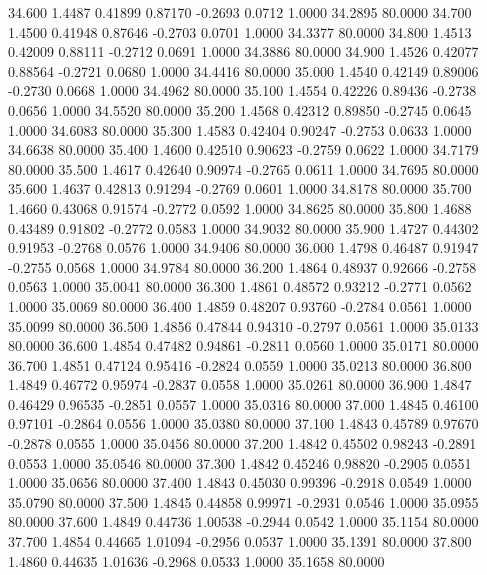   34.600   1.4487   0.41899   0.87170  -0.2693   0.0712   1.0000  34.2895  80.0000
  34.700   1.4500   0.41948   0.87646  -0.2703   0.0701   1.0000  34.3377  80.0000
  34.800   1.4513   0.42009   0.88111  -0.2712   0.0691   1.0000  34.3886  80.0000
  34.900   1.4526   0.42077   0.88564  -0.2721   0.0680   1.0000  34.4416  80.0000
  35.000   1.4540   0.42149   0.89006  -0.2730   0.0668   1.0000  34.4962  80.0000
  35.100   1.4554   0.42226   0.89436  -0.2738   0.0656   1.0000  34.5520  80.0000
  35.200   1.4568   0.42312   0.89850  -0.2745   0.0645   1.0000  34.6083  80.0000
  35.300   1.4583   0.42404   0.90247  -0.2753   0.0633   1.0000  34.6638  80.0000
  35.400   1.4600   0.42510   0.90623  -0.2759   0.0622   1.0000  34.7179  80.0000
  35.500   1.4617   0.42640   0.90974  -0.2765   0.0611   1.0000  34.7695  80.0000
  35.600   1.4637   0.42813   0.91294  -0.2769   0.0601   1.0000  34.8178  80.0000
  35.700   1.4660   0.43068   0.91574  -0.2772   0.0592   1.0000  34.8625  80.0000
  35.800   1.4688   0.43489   0.91802  -0.2772   0.0583   1.0000  34.9032  80.0000
  35.900   1.4727   0.44302   0.91953  -0.2768   0.0576   1.0000  34.9406  80.0000
  36.000   1.4798   0.46487   0.91947  -0.2755   0.0568   1.0000  34.9784  80.0000
  36.200   1.4864   0.48937   0.92666  -0.2758   0.0563   1.0000  35.0041  80.0000
  36.300   1.4861   0.48572   0.93212  -0.2771   0.0562   1.0000  35.0069  80.0000
  36.400   1.4859   0.48207   0.93760  -0.2784   0.0561   1.0000  35.0099  80.0000
  36.500   1.4856   0.47844   0.94310  -0.2797   0.0561   1.0000  35.0133  80.0000
  36.600   1.4854   0.47482   0.94861  -0.2811   0.0560   1.0000  35.0171  80.0000
  36.700   1.4851   0.47124   0.95416  -0.2824   0.0559   1.0000  35.0213  80.0000
  36.800   1.4849   0.46772   0.95974  -0.2837   0.0558   1.0000  35.0261  80.0000
  36.900   1.4847   0.46429   0.96535  -0.2851   0.0557   1.0000  35.0316  80.0000
  37.000   1.4845   0.46100   0.97101  -0.2864   0.0556   1.0000  35.0380  80.0000
  37.100   1.4843   0.45789   0.97670  -0.2878   0.0555   1.0000  35.0456  80.0000
  37.200   1.4842   0.45502   0.98243  -0.2891   0.0553   1.0000  35.0546  80.0000
  37.300   1.4842   0.45246   0.98820  -0.2905   0.0551   1.0000  35.0656  80.0000
  37.400   1.4843   0.45030   0.99396  -0.2918   0.0549   1.0000  35.0790  80.0000
  37.500   1.4845   0.44858   0.99971  -0.2931   0.0546   1.0000  35.0955  80.0000
  37.600   1.4849   0.44736   1.00538  -0.2944   0.0542   1.0000  35.1154  80.0000
  37.700   1.4854   0.44665   1.01094  -0.2956   0.0537   1.0000  35.1391  80.0000
  37.800   1.4860   0.44635   1.01636  -0.2968   0.0533   1.0000  35.1658  80.0000
